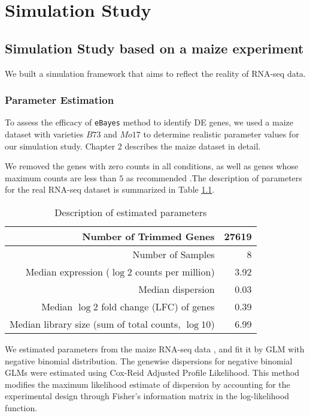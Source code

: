 \chapter{Simulation Study}

\section{Simulation Study based on a maize experiment}

We built a simulation framework that aims to reflect the reality of RNA-seq data. 

\subsection{Parameter Estimation}

To assess the efficacy of \texttt{eBayes} method to identify DE genes, we used a maize dataset with varieties $B73$ and $Mo17$ \citep{paschold2012complementation} to determine realistic parameter values for our simulation study. Chapter 2 describes the maize dataset in detail. 

We removed the genes with zero counts in all conditions, as well as genes whose maximum counts are less than $5$ as recommended \citep{rau2013data}.The description of parameters for the real RNA-seq dataset is summarized in Table \ref{tab:Parameter-Estimation}. 

\begin{table}[ht]
\centering
\begin{tabular}{|r|r|}
\hline
Number of Trimmed Genes & 27619 \\ 
\hline
Number of Samples & 8\\
\hline
  Median expression ($\log{2}$ counts per million) & 3.92 \\ 
  \hline
  Median dispersion & 0.03 \\ 
  \hline
  Median $\log{2}$ fold change (LFC) of genes & 0.39 \\ 
  \hline
  Median library size (sum of total counts, $\log{10}$) & 6.99 \\ 
   \hline
\end{tabular}

\caption{Description of estimated parameters}
\label{tab:Parameter-Estimation}


\end{table}

We estimated parameters from the maize RNA-seq data \citep{paschold2012complementation}, and fit it by GLM with negative binomial distribution. The genewise dispersions for negative binomial GLMs were estimated using Cox-Reid Adjusted Profile Likelihood\citep{mccarthy2012differential}. This method modifies the maximum likelihood estimate of dispersion by accounting for the experimental design through Fisher's information matrix in the log-likelihood function\citep{mccarthy2012differential}. 

